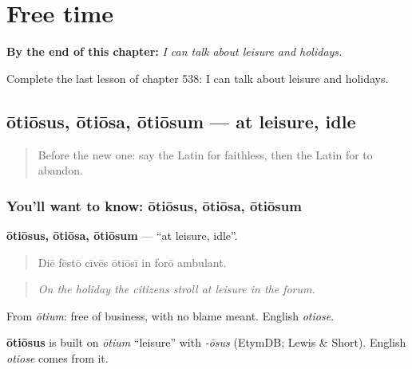 
\chapter{Free time}
\label{ch:la-free-time}

\begin{chapteropening}
\textbf{By the end of this chapter:} \emph{I can talk about leisure and holidays.}

Complete the last lesson of chapter 538: I can talk about leisure and holidays.
\end{chapteropening}

\section[ōtiōsus, ōtiōsa, ōtiōsum]{ōtiōsus, ōtiōsa, ōtiōsum — at leisure, idle}

\label{lesson:LA-C538-otiosus}



\begin{quote}
Before the new one: say the Latin for faithless, then the Latin for to abandon.
\end{quote}

\subsection*{You'll want to know: ōtiōsus, ōtiōsa, ōtiōsum}
\textbf{ōtiōsus, ōtiōsa, ōtiōsum} — \textquotedblleft{}at leisure, idle\textquotedblright{}.

\begin{quote}
Diē fēstō cīvēs ōtiōsī in forō ambulant.
\end{quote}

\begin{quote}
\emph{On the holiday the citizens stroll at leisure in the forum.}
\end{quote}

From \emph{ōtium}: free of business, with no blame meant. English \emph{otiose}.

\begin{cousinweb}
\textbf{ōtiōsus} is built on \emph{ōtium} \textquotedblleft{}leisure\textquotedblright{} with \emph{-ōsus} (EtymDB; Lewis \& Short). English \emph{otiose} comes from it.
\end{cousinweb}

